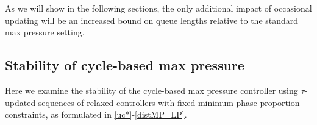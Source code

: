 As we will show in the following sections, the only additional impact of occasional updating will be an increased bound on queue lengths relative to the standard max pressure setting.
\subsection*{Stability of cycle-based max pressure}
Here we examine the stability of the cycle-based max pressure controller using $\tau$-updated sequences of relaxed controllers with fixed minimum phase proportion constraints, as formulated in \eqref{uc*}-\eqref{distMP_LP}.

